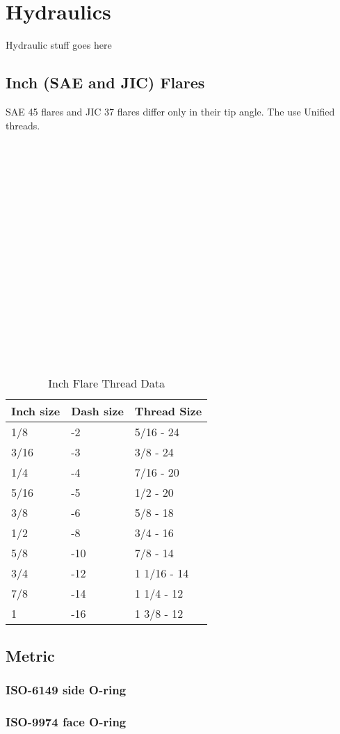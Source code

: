 \chapter{Hydraulics}
Hydraulic stuff goes here
\section{Inch (SAE and JIC) Flares}
SAE 45\degree{} flares and JIC 37\degree{} flares differ only in their tip angle.  The use Unified threads.
\\ \\ \\ \\ \\ \\ \\ \\ \\ \\ \\ \\ \\ \\ \\ \\ \\ \\

\begin{table}[h]
\begin{longtable}{l|l|l}
Inch size&Dash size&Thread Size\\
\hline
1/8      &-2  &5/16 - 24   \\
3/16     &-3  &3/8 - 24    \\
1/4      &-4  &7/16 - 20   \\
5/16     &-5  &1/2 - 20    \\
3/8      &-6  &5/8 - 18    \\
1/2      &-8  &3/4 - 16    \\
5/8      &-10 &7/8 - 14    \\
3/4      &-12 &1 1/16 - 14 \\
7/8      &-14 &1 1/4 - 12  \\
1        &-16 &1 3/8 - 12  \\
\end{longtable}
\caption{Inch Flare Thread Data}
\end{table}
\section{Metric}
\subsection{ISO-6149 side O-ring}
\subsection{ISO-9974 face O-ring}

